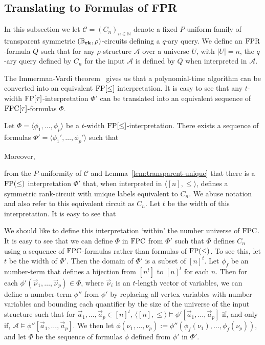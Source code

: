 \documentclass[../paper.tex]{subfiles}
\begin{document}
\subsection{Translating to Formulas of FPR}
\label{sec:translating-formulas-to-FPR}
In this subsection we let $\mathcal{C} = (C_n)_{n \in \mathbb{N}}$ denote a
fixed $P$-uniform family of transparent symmetric $(\mathbb{B}_{\text{\textbf{rk}}}, \rho)$-circuits
defining a $q$-ary query. We define an $\text{\upshape FPR}$-formula $Q$ such that for any
$\rho$-structure $\mathcal{A}$ over a universe $U$, with $\vert U \vert = n$,
the $q$-ary query defined by $C_n$ for the input $\mathcal{A}$ is defined by $Q$
when interpreted in $\mathcal{A}$.

The Immerman-Vardi theorem~\cite{Immerman198686, Vardi:1982} gives us that a
polynomial-time algorithm can be converted into an equivalent $\text{\upshape FP}[\leq]$
interpretation. It is easy to see that any $t$-width $\text{\upshape FP}[\tau]$-interpretation $\Phi'$
can be translated into an equivalent sequence of $\text{\upshape FPC}[\tau]$-formulas $\Phi$.

\begin{lemma}
  Let $\Phi = \langle \phi_1, \ldots , \phi_p \rangle$ be a $t$-width
  $\text{\upshape FP}[\leq]$-interpretation. There exists a sequence of formulas $\Phi' =
  \langle \phi_1' , \ldots, \phi_p' \rangle$ such that 
  \end{lemma}
Moreover, 

from the $P$-uniformity of $\mathcal{C}$ and
Lemma~\ref{lem:transparent-unique} that there is a $\text{\upshape FP}(\leq)$ interpretation
$\Phi'$ that, when interpreted in $\langle [n], \leq \rangle$, defines a
symmetric rank-circuit with unique labels equivalent to $C_n$. We abuse notation
and also refer to this equivalent circuit as $C_n$. Let $t$ be the width of this
interpretation. It is easy to see that

We should like to define this interpretation `within' the number universe of
$\text{\upshape FPC}$. It is easy to see that we can define $\Phi$ in $\text{\upshape FPC}$ from $\Phi'$ such
that $\Phi$ defines $C_n$ using a sequence of $\text{\upshape FPC}$-formulas rather than formulas
of $\text{\upshape FP}(\leq)$. To see this, let $t$ be the width of $\Phi'$. Then the domain of
$\Phi'$ is a subset of $[n]^t$. Let $\phi_f$ be an number-term that defines a
bijection from $[n^t]$ to $[n]^t$ for each $n$. Then for each $\phi'
(\vec{\nu}_1, \ldots, \vec{\nu}_{p}) \in \Phi$, where $\vec{\nu}_i$ is an
$t$-length vector of variables, we can define a number-term $\phi''$ from
$\phi'$ by replacing all vertex variables with number variables and bounding
each quantifier by the size of the universe of the input structure such that for
$\vec{a}_1, \ldots, \vec{a}_p \in [n]^t$, $\langle [n], \leq \rangle \models
\phi' [\vec{a}_1, \ldots, \vec{a}_p]$ if, and only if, $\mathcal{A} \models
\phi'' [\vec{a}_1, \ldots, \vec{a}_p]$. We then let $\phi(\nu_1, \ldots, \nu_p)
:= \phi''(\phi_f (\nu_1), \ldots, \phi_f(\nu_p))$, and let $\Phi$ be the
sequence of formulas $\phi$ defined from $\phi'$ in $\Phi'$.
\end{document}
